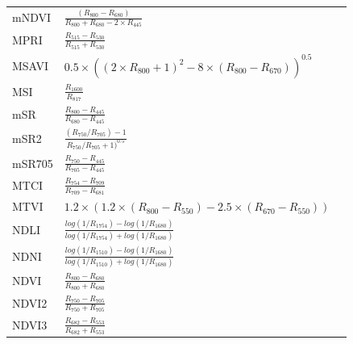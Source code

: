 \documentclass[remotesensing,article,submit,moreauthors,pdftex]{Definitions/mdpi}
\begin{document}
{\begin{supertabular}{lll}
		mNDVI           & $\frac{(R_{800}-R_{680})}{R_{800}+R_{680}-2 \times R_{445}}$                                         & \cite{sims2002}              \\
		MPRI            & $\frac{R_{515}-R_{530}}{R_{515}+R_{530}}$                                                            & \cite{hernandez-clemente2011} \\
		MSAVI           & \parbox{5.5cm}{$0.5 \times ((2\times R_{800}+1)^2-8\times (R_{800}-R_{670}))^{0.5}$}                 & \cite{qi1994}                 \\
		MSI             & $\frac{R_{1600}}{R_{817}}$                                                                           & \cite{hunt1989}               \\
		mSR             & $\frac{R_{800}-R_{445}}{R_{680}-R_{445}}$                                                            & \cite{sims2002}              \\
		mSR2            & $\frac{(R_{750}/R_{705})-1}{R_{750}/R_{705}+1)^{0.5}}$                                               & \cite{chen1996}               \\
		mSR705          & $\frac{R_{750}-R_{445}}{R_{705}-R_{445}}$                                                            & \cite{sims2002}              \\
		MTCI            & $\frac{R_{754}-R_{709}}{R_{709}-R_{681}}$                                                            & \cite{dash2007}               \\
		\midrule
		MTVI            & \parbox{3.8cm}{$1.2 \times (1.2 \times (R_{800}-R_{550})-2.5 \times (R_{670}-R_{550}))$}             & \cite{haboudane2002}          \\
		\midrule
		NDLI            & $\frac{log(1/R_{1754}) - log(1/R_{1680})}{log(1/R_{1754}) + log(1/R_{1680})}$                        & \cite{serrano2002}            \\
		NDNI            & $\frac{log(1/R_{1510}) - log(1/R_{1680})}{log(1/R_{1510}) + log(1/R_{1680})}$                        & \cite{serrano2002}            \\
		NDVI            & $\frac{R_{800}-R_{680}}{R_{800}+R_{680}}$                                                            & \cite{tucker1979}             \\
		NDVI2           & $\frac{R_{750}-R_{705}}{R_{750}+R_{705}}$                                                            & \cite{gitelson1994}           \\
		NDVI3           & $\frac{R_{682}-R_{553}}{R_{682}+R_{553}}$                                                            & \cite{guanter2005}            \\

\end{supertabular}}
\end{document}
